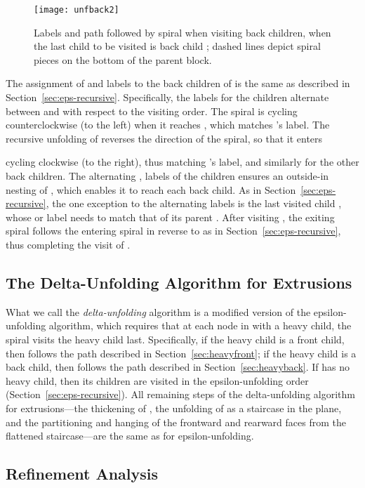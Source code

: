 \documentclass[11pt]{article}
\begin{document}
\begin{figure}[htbp]
\centering
\texttt{[image: unfback2]}
\caption{Labels and path followed by spiral when visiting back children, when the last child
to be visited is back child ;
dashed
lines depict spiral pieces on the bottom of the parent block.}
\label{fig:unfback}
\end{figure}


The assignment of  and  labels to the back children of  is the same as described
in Section~\ref{sec:eps-recursive}.
Specifically, the labels for the children alternate between 
and  with respect to the visiting order.  The spiral  is cycling
counterclockwise (to the left) when it reaches , which
matches 's  label.
The recursive unfolding of  reverses the direction of the spiral, so
that it enters

cycling clockwise (to the right), thus matching
's  label,
and similarly for the other back children.  The
alternating ,  labels of the children ensures an outside-in
nesting of , which enables it to reach each back
child.  As in Section~\ref{sec:eps-recursive}, the one exception to the
alternating labels is the last visited child , whose  or  label
needs to match that of its parent .
After visiting , the exiting spiral follows the entering spiral in reverse to 
as in Section~\ref{sec:eps-recursive}, thus completing the visit of .


\subsection{The Delta-Unfolding Algorithm for Extrusions}
\label{sec:analysis}

What we call the {\em delta-unfolding} algorithm is
a modified version of the epsilon-unfolding algorithm, which requires that at each node  in 
with a heavy child, the spiral  visits the heavy child last.
Specifically, if the heavy child is a front child, then  follows the
path described in Section~\ref{sec:heavyfront}; if the heavy child is a back child, then  follows the
path described in Section~\ref{sec:heavyback}.
If  has no heavy child, then its children are visited in the
epsilon-unfolding order (Section~\ref{sec:eps-recursive}).
All remaining steps of the delta-unfolding algorithm for extrusions---the
thickening of , the unfolding of  as a staircase in the plane,
and the partitioning and hanging of the frontward and rearward faces from the
flattened staircase---are the same as for epsilon-unfolding.

\subsection{Refinement Analysis}
\end{document}
